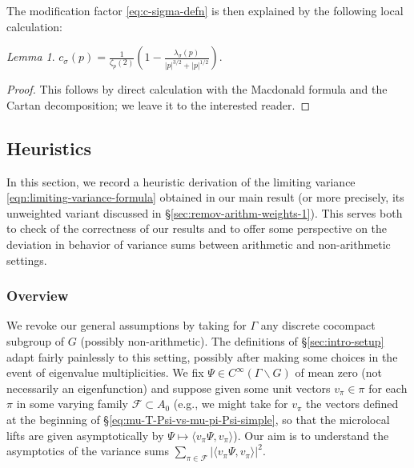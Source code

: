 \documentclass[reqno,10pt]{amsart}
\theoremstyle{plain} %
\theoremstyle{definition}
\theoremstyle{plain} %
\theoremstyle{remark}
\theoremstyle{itplain} %
\newtheorem*{lemma*}{Lemma}
\theoremstyle{remark} %
\numberwithin{equation}{section}
\begin{document}
The modification factor \eqref{eq:c-sigma-defn} is then explained by the following local calculation:
\begin{lemma*}
  $c_\sigma(p) = \frac{1}{\zeta_p(2)} (1 - \frac{\lambda_\sigma(p)}{|p|^{3/2} + |p|^{1/2}})$.
\end{lemma*}
\begin{proof}
  This follows by direct calculation with the Macdonald formula \cite[Thm 4.6.6]{MR1431508} and the Cartan decomposition; we leave it to the interested reader.
\end{proof}

\subsection{Heuristics}\label{sec:heuristics}
In this section, we record a heuristic derivation of the limiting variance \eqref{eqn:limiting-variance-formula} obtained in our main result (or more precisely, its unweighted variant discussed in \S\ref{sec:remov-arithm-weights-1}).  This serves both to check of the correctness
of our results and to offer some perspective on the deviation in behavior of variance sums between arithmetic and non-arithmetic settings.


\subsubsection{Overview}\label{sec:35ac3e57aa}
We revoke our general assumptions by taking for $\Gamma$ any discrete cocompact subgroup of $G$ (possibly non-arithmetic).  The definitions of \S\ref{sec:intro-setup} adapt fairly painlessly to this setting, possibly after making some choices in the event of eigenvalue multiplicities.  We fix $\Psi \in C^\infty(\Gamma \backslash G)$ of mean zero (not necessarily an eigenfunction) and suppose given some unit vectors $v_\pi \in \pi$ for each $\pi$ in some varying family $\mathcal{F} \subset A_0$ (e.g., we might take for $v_\pi$ the vectors defined at the beginning of \S\ref{eq:mu-T-Psi-vs-mu-pi-Psi-simple}, so that the microlocal lifts are given asymptotically by $\Psi \mapsto \langle v_\pi \Psi, v_\pi \rangle$).  Our aim is to understand the asymptotics of the variance sums $\sum_{\pi \in \mathcal{F}} |\langle v_\pi \Psi, v_\pi \rangle|^2$.
\end{document}
